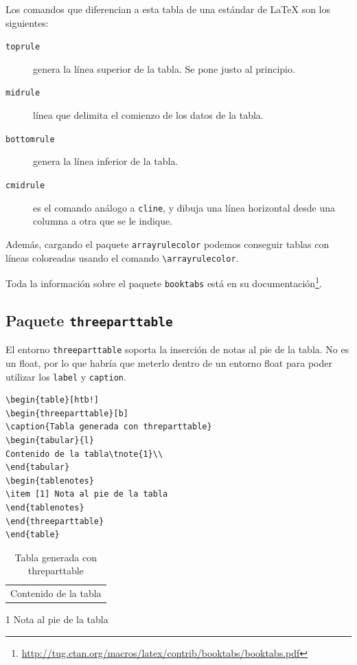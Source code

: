 \documentclass[12pt,a4paper, oneside]{report}
\begin{document}
Los comandos que diferencian a esta tabla de una estándar de \LaTeX{} son los
siguientes:

\begin{description}
\item [\texttt{toprule}] genera la línea superior de la tabla. Se pone justo al
principio.
\item [\texttt{midrule}] línea que delimita el comienzo de los datos de la
tabla.
\item [\texttt{bottomrule}] genera la línea inferior de la tabla.
\item [\texttt{cmidrule}] es el comando análogo a \texttt{cline}, y dibuja una
línea horizontal desde una columna a otra que se le indique.
\end{description}

Además, cargando el paquete \texttt{arrayrulecolor} podemos conseguir tablas con
líneas coloreadas usando el comando \verb+\arrayrulecolor+.

Toda la información sobre el paquete \verb+booktabs+ está en su
documentación\footnote{\url{
http://tug.ctan.org/macros/latex/contrib/booktabs/booktabs.pdf}}.

\clearpage
\subsection{Paquete \texttt{threeparttable}}

El entorno \verb+threeparttable+ soporta la inserción de notas al pie de la
tabla. No es un float, por lo que habría que meterlo dentro de un entorno float
para poder utilizar los \texttt{label} y \texttt{caption}.

\begin{lstlisting}
\begin{table}[htb!]
\begin{threeparttable}[b]
\caption{Tabla generada con threparttable}
\begin{tabular}{l}
Contenido de la tabla\tnote{1}\\
\end{tabular}
\begin{tablenotes}
\item [1] Nota al pie de la tabla
\end{tablenotes}
\end{threeparttable}
\end{table}
\end{lstlisting}

\begin{table}[htb!]
\begin{threeparttable}[b]
\caption{Tabla generada con threparttable}
\begin{tabular}{l}
Contenido de la tabla\tnote{1}\\
\end{tabular}
\begin{tablenotes}
\item [1] Nota al pie de la tabla
\end{tablenotes}
\end{threeparttable}
\end{table}
\end{document}
